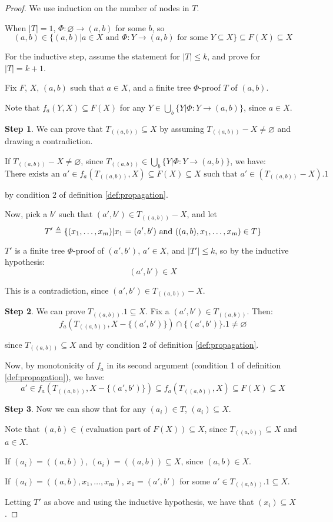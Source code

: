 \documentclass[12pt]{article}
\begin{document}
\begin{proof}
	We use induction on the number of nodes in $T$.

	When $|T|=1$, $\Phi:\varnothing\rightarrow (a,b)$ for some $b$, so
	\[(a,b)\in\{(a,b)|a\in X\text{ and }\Phi:Y\rightarrow (a,b)\text{ for some }Y\subseteq X\}\subseteq F(X)\subseteq X\]

	For the inductive step, assume the statement for $|T|\le k$, and prove for $|T|=k+1$.

	Fix $F$, $X$, $(a,b)$ such that $a\in X$, and a finite tree $\Phi$-proof $T$ of $(a,b)$.

  Note that $f_a(Y,X)\subseteq F(X)$ for any $Y\in\bigcup_{b}\{Y|\Phi:Y\rightarrow(a,b)\}$, since $a\in X$.

	\noindent\textbf{Step 1}. We can prove that $T_{((a,b))}\subseteq X$ by assuming $T_{((a,b))}-X\neq\varnothing$ and drawing a contradiction.

	If $T_{((a,b))}-X\neq\varnothing$, since $T_{((a,b))}\in\bigcup_b\{Y|\Phi:Y\rightarrow (a,b)\}$, we have:
	\[\text{There exists an }a'\in f_a(T_{((a,b))},X)\subseteq F(X)\subseteq X\text{ such that }a'\in(T_{((a,b))}-X).1\]

	by condition 2 of definition \ref{def:propagation}.

	Now, pick a $b'$ such that $(a',b')\in T_{((a,b))}-X$, and let
	\[T'\triangleq\{(x_1,\dots,x_m)|x_1=(a',b')\text{ and }((a,b),x_1,\dots,x_m)\in T\}\]

	$T'$ is a finite tree $\Phi$-proof of $(a',b')$, $a'\in X$, and $|T'|\le k$, so by the inductive hypothesis:
	\[(a',b')\in X\]

	This is a contradiction, since $(a',b')\in T_{((a,b))}-X$.

	\noindent\textbf{Step 2}. We can prove $T_{((a,b))}.1\subseteq X$. Fix a $(a',b')\in T_{((a,b))}$. Then:
	\[f_a(T_{((a,b))},X-\{(a',b')\})\cap\{(a',b')\}.1\neq\varnothing\]

	since $T_{((a,b))}\subseteq X$ and by condition 2 of definition \ref{def:propagation}.

	Now, by monotonicity of $f_a$ in its second argument (condition 1 of definition \ref{def:propagation}), we have:
  \[a'\in f_a(T_{((a,b))},X-\{(a',b')\})\subseteq f_a(T_{((a,b))},X)\subseteq F(X)\subseteq X\]

	\noindent\textbf{Step 3}. Now we can show that for any $(a_i)\in T$, $(a_i)\subseteq X$.

  Note that $(a,b)\in(\text{evaluation part of }F(X))\subseteq X$, since $T_{((a,b))}\subseteq X$ and $a\in X$.

  If $(a_i)=((a,b))$, $(a_i)=((a,b))\subseteq X$, since $(a,b)\in X$.

	If $(a_i)=((a,b),x_1,\dots,x_m)$, $x_1=(a',b')$ for some $a'\in T_{((a,b))}.1\subseteq X$.

	Letting $T'$ as above and using the inductive hypothesis, we have that $(x_i)\subseteq X$.
\end{proof}
\end{document}
